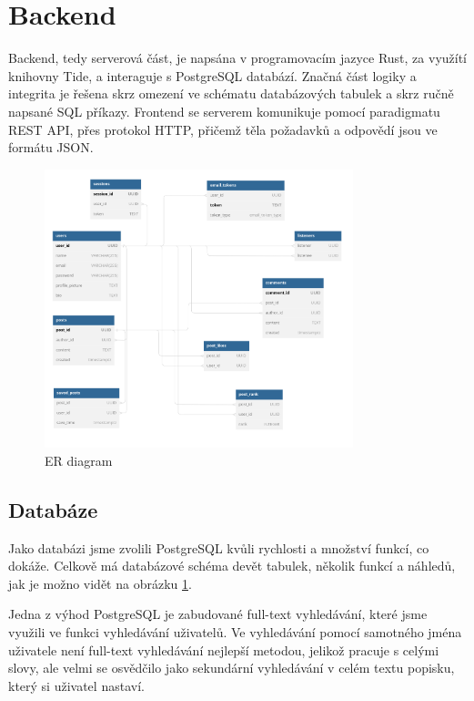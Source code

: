 \section{Backend}

Backend, tedy serverová část, je napsána v programovacím jazyce Rust, za využítí knihovny Tide, a
interaguje s PostgreSQL databází. Značná část logiky a integrita je řešena skrz omezení ve schématu
databázových tabulek a skrz ručně napsané SQL příkazy. Frontend se serverem komunikuje pomocí
paradigmatu REST API, přes protokol HTTP, přičemž těla požadavků a odpovědí jsou ve formátu JSON.

\begin{figure}[h!] 
    \centering
    \includegraphics[width=0.8\textwidth]{images/er-diagram.png}
    \caption{ER diagram}
    \label{er-diagram}
\end{figure}

\subsection{Databáze}

Jako databázi jsme zvolili PostgreSQL kvůli rychlosti a množství funkcí, co dokáže. Celkově má
databázové schéma devět tabulek, několik funkcí a náhledů, jak je možno vidět na obrázku
\ref{er-diagram}.

Jedna z výhod PostgreSQL je zabudované full-text vyhledávání, které jsme využili ve funkci
vyhledávání uživatelů. Ve vyhledávání pomocí samotného jména uživatele není full-text vyhledávání
nejlepší metodou, jelikož pracuje s celými slovy, ale velmi se osvědčilo jako sekundární vyhledávání
v celém textu popisku, který si uživatel nastaví.

